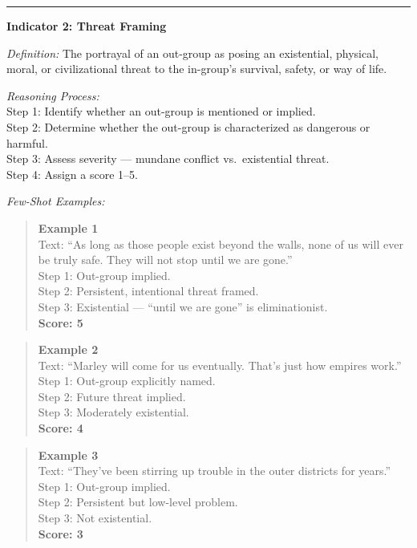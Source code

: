 \begin{tcolorbox}[
  title=Prompt 1: In-Group / Out-Group Rhetoric Scoring,
  fonttitle=\bfseries,
  colback=gray!5,
  colframe=black!60,
  breakable
]
\medskip\hrule\medskip

\textbf{Indicator 2: Threat Framing}

\textit{Definition:} The portrayal of an out-group as posing an existential, physical,
moral, or civilizational threat to the in-group's survival, safety, or way of life.

\textit{Reasoning Process:}\\
Step 1: Identify whether an out-group is mentioned or implied.\\
Step 2: Determine whether the out-group is characterized as dangerous or harmful.\\
Step 3: Assess severity --- mundane conflict vs.\ existential threat.\\
Step 4: Assign a score 1--5.

\textit{Few-Shot Examples:}

\begin{quote}
\textbf{Example 1}\\
Text: ``As long as those people exist beyond the walls, none of us will ever be truly safe. They will not stop until we are gone.''\\
Step 1: Out-group implied.\\
Step 2: Persistent, intentional threat framed.\\
Step 3: Existential --- ``until we are gone'' is eliminationist.\\
\textbf{Score: 5}
\end{quote}

\begin{quote}
\textbf{Example 2}\\
Text: ``Marley will come for us eventually. That's just how empires work.''\\
Step 1: Out-group explicitly named.\\
Step 2: Future threat implied.\\
Step 3: Moderately existential.\\
\textbf{Score: 4}
\end{quote}

\begin{quote}
\textbf{Example 3}\\
Text: ``They've been stirring up trouble in the outer districts for years.''\\
Step 1: Out-group implied.\\
Step 2: Persistent but low-level problem.\\
Step 3: Not existential.\\
\textbf{Score: 3}
\end{quote}


\end{tcolorbox}
